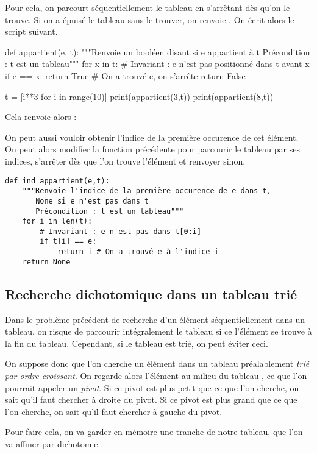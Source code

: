 Pour cela, on parcourt séquentiellement le tableau en s'arrêtant dès qu'on le trouve. Si on a épuisé 
le tableau sans le trouver, on renvoie . 
On écrit alors le script suivant.
\begin{pyblock}
def appartient(e, t):
    """Renvoie un booléen disant si e appartient à t
       Précondition : t est un tableau"""
    for x in t:
        # Invariant : e n'est pas positionné dans t avant x
        if e == x:
            return True # On a trouvé e, on s'arrête
    return False
 
t = [i**3 for i in range(10)]
print(appartient(3,t))
print(appartient(8,t))
\end{pyblock}
Cela renvoie alors :
\begin{quote}
\printpythontex[verb]
\end{quote}
On peut aussi vouloir obtenir l'indice de la première occurence de cet élément.
On peut alors modifier la fonction précédente pour parcourir le tableau par ses indices, s'arrêter 
dès que l'on trouve l'élément et renvoyer  sinon.
\begin{lstlisting}
def ind_appartient(e,t):
    """Renvoie l'indice de la première occurence de e dans t,
       None si e n'est pas dans t
       Précondition : t est un tableau"""
    for i in len(t):
        # Invariant : e n'est pas dans t[0:i]
        if t[i] == e:
            return i # On a trouvé e à l'indice i
    return None
\end{lstlisting}

\subsection{Recherche dichotomique dans un tableau trié}

Dans le problème précédent de recherche d'un élément séquentiellement dans un tableau, on risque de parcourir intégralement le tableau si ce l'élément se trouve à la fin du tableau. 
Cependant, si le tableau est trié, on peut éviter ceci. 

On suppose donc que l'on cherche un élément dans un tableau préalablement \emph{trié par ordre croissant}. On regarde alors l'élément \og au milieu du tableau \fg{}, ce que l'on pourrait appeler un  \emph{pivot}. 
Si ce pivot est plus petit que ce que l'on cherche, on sait qu'il faut chercher à droite du pivot. 
Si ce pivot est plus grand que ce que l'on cherche, on sait qu'il faut chercher à gauche du pivot. 

Pour faire cela, on va garder en mémoire une tranche de notre tableau, que l'on va affiner par dichotomie. 

